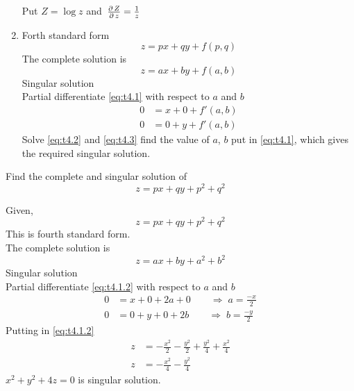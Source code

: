 \documentclass[../main-sheet.tex]{subfiles}
\begin{document}
\begin{enumerate}[label=\underline{Type - \Roman*}:]
\begin{soln}
\begin{equation}
        \end{equation}
        Put \(Z=\log z\) and \(\,\frac{\partial\, Z}{\partial\, z}=\frac{1}{z}\)
    \end{soln}
    \item Forth standard form
    \[z=px+qy+f(p,q)\]
    The complete solution is
    \begin{equation}
        z=ax+by+f(a,b)\label{eq:t4.1}
    \end{equation}
    Singular solution\\
    Partial differentiate \eqref{eq:t4.1} with respect to \(a\) and \(b\)
    \begin{align}
        0&=x+0+f'(a,b)\label{eq:t4.2}\\
        0&=0+y+f'(a,b)\label{eq:t4.3}
    \end{align}
    Solve \eqref{eq:t4.2} and \eqref{eq:t4.3} find the value of \(a\), \(b\) put in \eqref{eq:t4.1}, which gives the required singular solution.
\end{enumerate}
\begin{prob}
    Find the complete and singular solution of 
    \[z=px+qy+p^2+q^2\]
\end{prob}
\begin{soln}
    Given,
    \begin{equation}
        z=px+qy+p^2+q^2\label{eq:t4.1.1}
    \end{equation}
    This is fourth standard form.\\
    The complete solution is
    \begin{equation}
        z=ax+by+a^2+b^2\label{eq:t4.1.2}
    \end{equation}
    Singular solution\\
    Partial differentiate \eqref{eq:t4.1.2} with respect to \(a\) and \(b\)
    \begin{align*}
        0&=x+0+2a+0\qquad\Rightarrow\;a=\frac{-x}{2}\\
        0&=0+y+0+2b\qquad\Rightarrow\;b=\frac{-y}{2}
    \end{align*}
    Putting in \eqref{eq:t4.1.2}
    \begin{align*}
        z&=-\frac{x^2}{2}-\frac{y^2}{2}+\frac{y^2}{4}+\frac{x^2}{4}\\
        z&=-\frac{x^2}{4}-\frac{y^2}{4}
    \end{align*}
    \(x^2+y^2+4z=0\) is singular solution.
\end{soln}%
\end{document}
